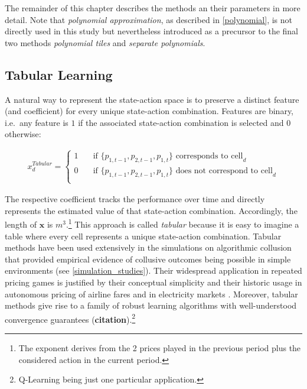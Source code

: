 The remainder of this chapter describes the methods an their parameters in more detail. Note that \emph{polynomial approximation}, as described in \autoref{polynomial}, is not directly used in this study but nevertheless introduced as a precursor to the final two methods \emph{polynomial tiles} and \emph{separate polynomials}.


\subsection{Tabular Learning}\label{tabular}

A natural way to represent the state-action space is to preserve a distinct feature (and coefficient) for every unique state-action combination. Features are binary, i.e.\ any feature is  $1$ if the associated state-action combination is selected and $0$ otherwise:

\begin{gather}\label{cell_activation}
x_d^{Tabular} = \begin{cases}
1 & \quad \text{if } \{p_{1, t-1}, p_{2, t-1}, p_{1, t}\} \text{~corresponds to cell}_d  \\
0 & \quad \text{if } \{p_{1, t-1}, p_{2, t-1}, p_{1, t}\} \text{~does not correspond to cell}_d \\ \end{cases} 
\end{gather}

The respective coefficient tracks the performance over time and directly represents the estimated value of that state-action combination. Accordingly, the length of $\boldsymbol{x}$ is $m^3$.\footnote{The exponent derives from the 2 prices played in the previous period plus the considered action in the current period.} This approach is called \emph{tabular} because it is easy to imagine a table where every cell represents a unique state-action combination. Tabular methods have been used extensively in the simulations on algorithmic collusion that provided empirical evidence of collusive outcomes being possible in simple environments (see \autoref{simulation_studies}). Their widespread application in repeated pricing games is justified by their conceptual simplicity and their historic usage in autonomous pricing of airline fares and in electricity markets \parencite{ittoo_algorithmic_2017}. Moreover, tabular methods give rise to a family of robust learning algorithms with well-understood convergence guarantees (\textbf{citation}).\footnote{Q-Learning being just one particular application.}

